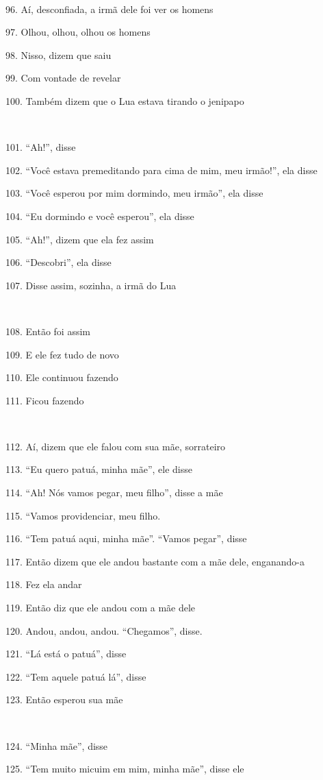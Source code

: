 ~

96. Aí, desconfiada, a irmã dele foi ver os homens

97. Olhou, olhou, olhou os homens

98. Nisso, dizem que saiu

99. Com vontade de revelar

100. Também dizem que o Lua estava tirando o jenipapo

~

101. ``Ah!'', disse

102. ``Você estava premeditando para cima de mim, meu irmão!'', ela disse

103. ``Você esperou por mim dormindo, meu irmão'', ela disse

104. ``Eu dormindo e você esperou'', ela disse

105. ``Ah!'', dizem que ela fez assim

106. ``Descobri'', ela disse

107. Disse assim, sozinha, a irmã do Lua

~

108. Então foi assim

109. E ele fez tudo de novo

110. Ele continuou fazendo

111. Ficou fazendo

~

112. Aí, dizem que ele falou com sua mãe, sorrateiro

113. ``Eu quero patuá, minha mãe'', ele disse

114. ``Ah! Nós vamos pegar, meu filho'', disse a mãe

115. ``Vamos providenciar, meu filho.

116. ``Tem patuá aqui, minha mãe''. ``Vamos pegar'', disse

117. Então dizem que ele andou bastante com a mãe dele, enganando-a

118. Fez ela andar

119. Então diz que ele andou com a mãe dele

120. Andou, andou, andou. ``Chegamos'', disse.

121. ``Lá está o patuá'', disse

122. ``Tem aquele patuá lá'', disse

123. Então esperou sua mãe

~

124. ``Minha mãe'', disse

125. ``Tem muito micuim em mim, minha mãe'', disse ele

